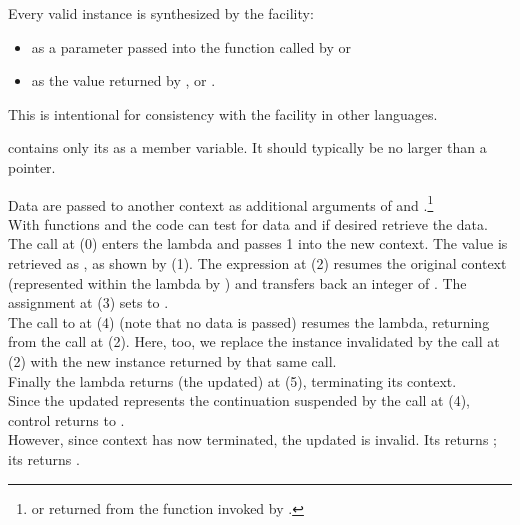 \newpage
{}\label{design}


Every valid \cont instance is synthesized by the \callcc facility:
\begin{itemize}
\item as a parameter passed into the function called by \callcc or \resumewith
\item as the value returned by \callcc, \resume or \resumewith.
\end{itemize}

This is intentional for consistency with the \cc facility in other
languages.\cite{schemecallcc}\citecomma\cite{rubycallcc}


\cont contains only its  as a member variable. It should
typically be no larger than a pointer.

\label{subsec:data}

Data are passed to another context as additional arguments of \callcc and
\resume.\footnote{or returned from the function invoked by \resumewith.}\\
With functions \dataavail and \getdata the code can test for data and if desired
retrieve the data.
The  call at (0) enters the lambda and passes 1 into the
new context. The value is retrieved as , as shown by (1). The expression
 at (2) resumes the original context (represented
within the lambda by ) and transfers back an integer of .
The assignment at (3) sets  to .\\
The call to  at (4) (note that no data is passed) resumes the
lambda, returning from the  call at (2). Here, too,
we replace the \cont instance  invalidated by the \resume call at (2)
with the new instance returned by that same \resume call.\\
Finally the lambda returns (the updated)  at (5), terminating its
context.\\
Since the updated  represents the continuation suspended by the call at
(4), control returns to \main.\\
However, since context  has now terminated, the updated  is
invalid. Its \opbool returns ; its  returns
.\\

